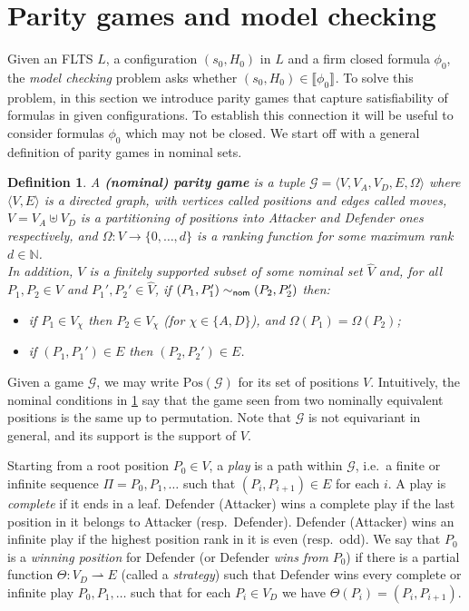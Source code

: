 \documentclass[10pt,a4paper]{article}
\newtheorem{definition}[theorem]{Definition}
\theoremstyle{definition}
\theoremstyle{remark}
\newcommand\boldemph[1]{\emph{\textbf{#1}}}
\newcommand\nomeq[0]{\sim_{\sf nom}}
\newcommand\pos[0]{\mathrm{Pos}}
\newcommand\sem[2][\xi]{\llbracket#2\rrbracket_{#1}}
\newcommand\Gcal{\mathcal{G}}
\newcommand\fgame[0]{\Gcal_\circledast}
\begin{document}
\section{Parity games and model checking}\label{sec:modelchecking}
\newcommand\ndb{qweqwe}
\renewcommand\fgame{\Gcal}
\newcommand\wellbound[1]{\triangleleft_{#1}}

Given an FLTS $L$, a configuration $(s_0,H_0)$ in $L$ and a firm closed formula $\phi_0$,
the \emph{model checking} problem asks whether $(s_0,H_0)\in\sem[]{\phi_0}$. To solve this problem, in this section we introduce parity games that capture satisfiability of formulas in given configurations. To establish this connection it will be useful to consider formulas $\phi_0$ which may not be closed.
We start off with a general definition of parity games in nominal sets.

\begin{definition}\label{def:paritygames}
  A \boldemph{(nominal) parity game} is a tuple $\Gcal=\langle V,V_A,V_D,E,\Omega\rangle$ where $\langle V,E\rangle$ is a directed graph, with vertices called \emph{positions} and edges called \emph{moves}, $V=V_A\uplus V_D$ is a partitioning of positions into \emph{Attacker} and \emph{Defender} ones respectively, and $\Omega:V\to\{0,\dots,d\}$ is a \emph{ranking function} for some maximum rank $d\in\mathbb{N}$.\\
  In addition, $V$ is a finitely supported subset of some nominal set $\hat V$ and, for all $P_1,P_2\in V$ and $P_1',P_2'\in\hat V$, if $(P_1,P_1')\nomeq (P_2,P_2')$ then:
  \begin{itemize}
  \item if $P_1\in V_\chi$ then $P_2\in V_\chi$ (for $\chi\in\{A,D\}$), and $\Omega(P_1)=\Omega(P_2)$;
  \item if $(P_1,P_1')\in E$ then $(P_2,P_2')\in E$.
  \end{itemize}
\end{definition}

Given a game $\Gcal$, we may write $\pos(\Gcal)$ for its set of positions $V$.
Intuitively, the nominal conditions in \cref{def:paritygames} say that the game seen from two nominally equivalent positions is the same up to permutation.
Note that $\Gcal$ is not equivariant in general, and its support is the support of $V$.

Starting from a root position $P_0\in V$, a \emph{play} is a path within $\Gcal$, i.e.\ a finite or infinite sequence $\Pi=P_0,P_1,\dots$ such that $(P_i,P_{i+1})\in E$ for each $i$. A play is \emph{complete} if it ends in a leaf. Defender (Attacker) wins a complete play if the last position in it belongs to Attacker (resp.~Defender). Defender (Attacker) wins an infinite play if the highest position rank in it is even (resp.~odd). We say that  $P_0$ is a \emph{winning position} for Defender (or Defender \emph{wins from} $P_0$) if there is a partial function $\Theta: V_D\rightharpoonup E$ (called a \emph{strategy}) such that Defender wins  every complete or infinite play $P_0,P_1,\dots$ such that for each $P_i\in V_D$ we have $\Theta(P_i)=(P_i,P_{i+1})$.
\end{document}
